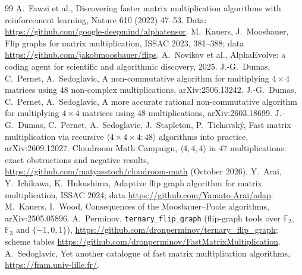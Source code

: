 \documentclass[11pt]{article}
\numberwithin{equation}{section}
\theoremstyle{definition}
\theoremstyle{remark}
\newcommand{\F}{\mathbb F}
\begin{document}
\begin{thebibliography}{99}
 A.~Fawzi et al., Discovering faster matrix multiplication algorithms with reinforcement
learning, Nature 610 (2022) 47--53. Data: \url{https://github.com/google-deepmind/alphatensor}.
 M.~Kauers, J.~Moosbauer, Flip graphs for matrix multiplication, ISSAC 2023, 381--388;
data \url{https://github.com/jakobmoosbauer/flips}.
 A.~Novikov et al., AlphaEvolve: a coding agent for scientific and algorithmic
discovery, 2025.
 J.-G.~Dumas, C.~Pernet, A.~Sedoglavic, A non-commutative algorithm for multiplying $4\times4$
matrices using $48$ non-complex multiplications, arXiv:2506.13242.
 J.-G.~Dumas, C.~Pernet, A.~Sedoglavic, A more accurate rational non-commutative algorithm for
multiplying $4\times4$ matrices using $48$ multiplications, arXiv:2603.18699.
 J.-G.~Dumas, C.~Pernet, A.~Sedoglavic, J.~Stapleton, P.~Tichavsk\'y, Fast matrix multiplication
via recursive $\langle4\times4\times4:48\rangle$ algorithms into practice, arXiv:2609.12027.
 Cloudroom Math Campaign, $\langle4,4,4\rangle$ in $47$ multiplications: exact obstructions and
negative results, \url{https://github.com/matyasstoch/cloudroom-math} (October 2026).
 Y.~Arai, Y.~Ichikawa, K.~Hukushima, Adaptive flip graph algorithm for matrix multiplication,
ISSAC 2024; data \url{https://github.com/Yamato-Arai/adap}.
 M.~Kauers, I.~Wood, Consequences of the Moosbauer--Poole algorithms, arXiv:2505.05896.
 A.~Perminov, \texttt{ternary\_flip\_graph} (flip-graph tools over $\F_2$, $\F_3$ and
$\{-1,0,1\}$), \url{https://github.com/dronperminov/ternary_flip_graph}; scheme tables
\url{https://github.com/dronperminov/FastMatrixMultiplication}.
 A.~Sedoglavic, Yet another catalogue of fast matrix multiplication algorithms,
\url{https://fmm.univ-lille.fr/}.
\end{thebibliography}
\end{document}
